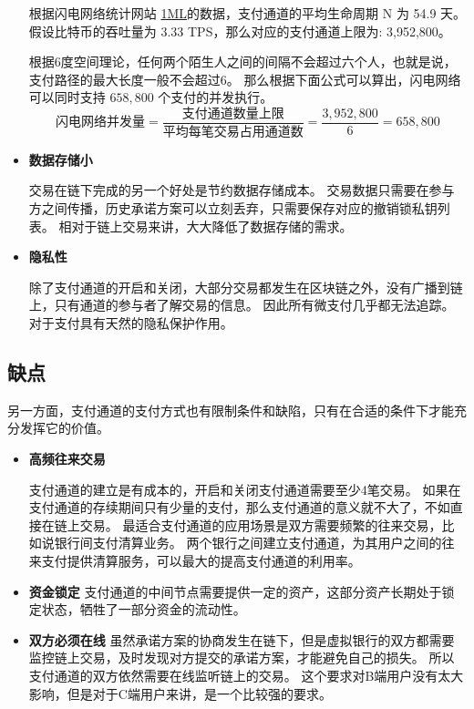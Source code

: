 \begin{itemize}
        根据闪电网络统计网站 \href{https://1ml.com/statistics}{1ML}的数据，支付通道的平均生命周期 N 为 54.9 天。
        假设比特币的吞吐量为 3.33 TPS，那么对应的支付通道上限为: 3,952,800。

        根据6度空间理论，任何两个陌生人之间的间隔不会超过六个人，也就是说，支付路径的最大长度一般不会超过6。
        那么根据下面公式可以算出，闪电网络可以同时支持 $658,800$ 个支付的并发执行。
        \begin{equation}
                    \text{闪电网络并发量} = \frac{\text{支付通道数量上限}}{\text{平均每笔交易占用通道数}} = \frac{3,952,800}{6} = 658,800
        \end{equation}

      \item \textbf{数据存储小}

        交易在链下完成的另一个好处是节约数据存储成本。
        交易数据只需要在参与方之间传播，历史承诺方案可以立刻丢弃，只需要保存对应的撤销锁私钥列表。
        相对于链上交易来讲，大大降低了数据存储的需求。

      \item \textbf{隐私性}

        除了支付通道的开启和关闭，大部分交易都发生在区块链之外，没有广播到链上，只有通道的参与者了解交易的信息。
        因此所有微支付几乎都无法追踪。对于支付具有天然的隐私保护作用。

\end{itemize}

\subsection{缺点}

另一方面，支付通道的支付方式也有限制条件和缺陷，只有在合适的条件下才能充分发挥它的价值。

\begin{itemize}
    \item \textbf{高频往来交易}

        支付通道的建立是有成本的，开启和关闭支付通道需要至少4笔交易。
        如果在支付通道的存续期间只有少量的支付，那么支付通道的意义就不大了，不如直接在链上交易。
        最适合支付通道的应用场景是双方需要频繁的往来交易，比如说银行间支付清算业务。
        两个银行之间建立支付通道，为其用户之间的往来支付提供清算服务，可以最大的提高支付通道的利用率。

    \item \textbf{资金锁定}
        支付通道的中间节点需要提供一定的资产，这部分资产长期处于锁定状态，牺牲了一部分资金的流动性。
    
    \item \textbf{双方必须在线}
        虽然承诺方案的协商发生在链下，但是虚拟银行的双方都需要监控链上交易，及时发现对方提交的承诺方案，才能避免自己的损失。
        所以支付通道的双方依然需要在线监听链上的交易。
        这个要求对B端用户没有太大影响，但是对于C端用户来讲，是一个比较强的要求。

\end{itemize}

